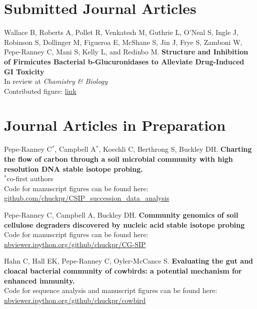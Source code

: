\documentclass[letterpaper]{article}
\renewenvironment{itemize}{
  \begin{list}{}{
    \setlength{\leftmargin}{1.5em}
  }
}{
  \end{list}
}
\begin{document}
\section*{Submitted Journal Articles}
\begin{itemize}
\item Wallace B, Roberts A, Pollet R, Venkatesh M, 
    Guthrie L, O'Neal S, Ingle J, Robinson S, Dollinger M, Figueroa E, 
    McShane S, Jin J, Frye S, Zamboni W, Pepe-Ranney C, Mani S, Kelly
    L, and Redinbo M. \textbf{Structure and Inhibition of Firmicutes
    Bacterial b-Glucuronidases to Alleviate Drug-Induced GI Toxicity}\\
    In review at \textit{Chamistry \& Biology}\\
    Contributed figure: \href{http://github.com/chuckpr/loop_tree}{link}
\end{itemize}
\section*{Journal Articles in Preparation}
\begin{itemize}
\item Pepe-Ranney C$^{*}$, Campbell A$^{*}$, Koechli C, Berthrong S, 
    Buckley DH. \textbf{Charting the flow of carbon through a soil
        microbial community with high resolution DNA stable isotope
        probing.}\\
    {\small$^{*}$co-first authors}\\
    Code for manuscript figures can be found here:\\
    \href{https://github.com/chuckpr/CSIP_succession_data_analysis}
    {github.com/chuckpr/CSIP\_succession\_data\_analysis}
\item Pepe-Ranney C, Campbell A, Buckley DH. 
    \textbf{Community genomics of soil cellulose degraders discovered by nucleic acid stable isotope probing}\\
    Code for manuscript figures can be found here:\\
    \href{http://nbviewer.ipython.org/github/chuckpr/CG-SIP}
    {nbviewer.ipython.org/github/chuckpr/CG-SIP}
\item Hahn C, Hall EK, Pepe-Ranney C, Oyler-McCance S.
    \textbf{Evaluating the gut and cloacal bacterial community of
    cowbirds: a potential mechanism for enhanced immunity.}\\
    Code for sequence analysis and manuscript figures can be found here:\\
    \href{http://nbviewer.ipython.org/github/chuckpr/cowbird}
    {nbviewer.ipython.org/github/chuckpr/cowbird}
\end{itemize}
\end{document}
